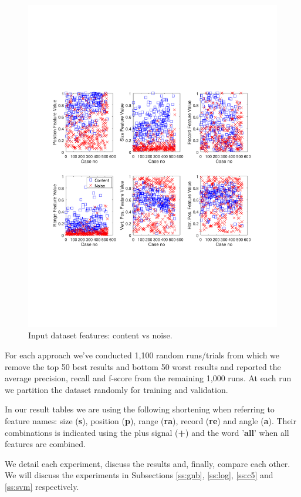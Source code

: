 \begin{figure}[h]
  \centering
     \includegraphics[trim={2.0cm 7.4cm 0.7cm 7.4cm}, clip,  width=\columnwidth]{img/dataset.pdf}
  \caption{Input dataset features: content vs noise.}
  \label{fig:dataset}
\end{figure}

For each approach we've conducted 1,100 random runs/trials from which we remove
the top 50 best results and bottom 50 worst results and reported the average
precision, recall and f-score from the remaining 1,000 runs. At each run we
partition the dataset randomly for training and validation.

In our result tables we are using the following shortening when referring to
feature names: size (\textbf{s}), position (\textbf{p}), range (\textbf{ra}),
record (\textbf{re}) and angle (\textbf{a}). Their combinations is indicated
using the plus signal (\textbf{+}) and the word '\textbf{all}' when all features
are combined.

We detail each experiment, discuss the results and, finally, compare each other.
We will discuss the experiments in Subsections \ref{ss:gnb}, \ref{ss:log},
\ref{ss:c5} and \ref{ss:svm} respectively.

